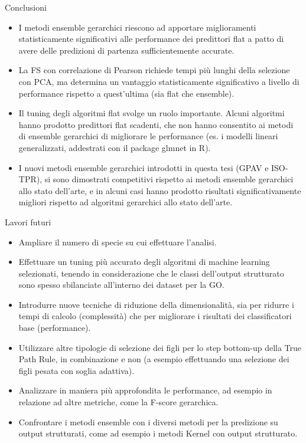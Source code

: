 \documentclass[9pt]{beamer}
\begin{document}
\begin{tframe}{Conclusioni}
\begin{itemize}
\item I metodi ensemble gerarchici riescono ad apportare miglioramenti statisticamente significativi alle performance dei predittori flat a patto di avere delle predizioni di partenza sufficientemente accurate.
\item La FS con correlazione di Pearson richiede tempi più lunghi della selezione con PCA, ma determina un vantaggio statisticamente significativo a livello di performance rispetto a quest’ultima (sia flat che ensemble).
\item Il tuning degli algoritmi flat svolge un ruolo importante. Alcuni algoritmi hanno prodotto predittori flat scadenti, che non hanno consentito ai metodi di ensemble gerarchici di migliorare le performance (es. i modelli lineari generalizzati, addestrati con il package glmnet in R).
\item I nuovi metodi ensemble gerarchici introdotti in questa tesi (GPAV e ISO-TPR), si sono dimostrati competitivi rispetto ai metodi ensemble gerarchici allo stato dell’arte, e in alcuni casi hanno prodotto risultati significativamente migliori rispetto ad algoritmi gerarchici allo stato dell'arte.
\end{itemize}
\end{tframe}
\begin{tframe}{Lavori futuri}
\begin{itemize}
\item Ampliare il numero di specie su cui effettuare l’analisi.
\item Effettuare un tuning più accurato degli algoritmi di machine learning selezionati, tenendo in considerazione che le classi dell’output strutturato sono
spesso sbilanciate all’interno dei dataset per la GO.
\item Introdurre nuove tecniche di riduzione della dimensionalità, sia per ridurre i tempi di calcolo (complessità) che per migliorare i risultati dei classificatori base (performance).
\item Utilizzare altre tipologie di selezione dei figli per lo step bottom-up della True Path Rule, in combinazione e non (a esempio effettuando una selezione
dei figli pesata con soglia adattiva).
\item Analizzare in maniera più approfondita le performance, ad esempio in relazione ad altre metriche, come la F-score gerarchica.
\item Confrontare i metodi ensemble con i diversi metodi per la predizione su
output strutturati, come ad esempio i metodi Kernel con output strutturato.
\end{itemize}
\end{tframe}
\end{document}
